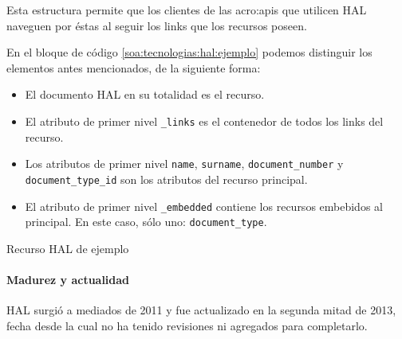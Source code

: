 Esta estructura permite que los clientes de las \glspl{acro:api} que utilicen HAL naveguen por éstas al seguir los links que los recursos poseen.

En el bloque de código \autoref{soa:tecnologias:hal:ejemplo} podemos distinguir los elementos antes mencionados, de la siguiente forma:

\begin{itemize}
  \item El documento HAL en su totalidad es el recurso.
  \item El atributo de primer nivel \verb|_links| es el contenedor de todos los links del recurso.
  \item Los atributos de primer nivel \texttt{name}, \texttt{surname}, \verb|document_number| y \\ \verb|document_type_id| son los atributos del recurso principal.
  \item El atributo de primer nivel \verb|_embedded| contiene los recursos embebidos al principal. En este caso, sólo uno: \verb|document_type|.

\end{itemize}

\begin{listing}
  \caption{Recurso HAL de ejemplo}
  \label{soa:tecnologias:hal:ejemplo}
\end{listing}

\paragraph{Madurez y actualidad}

HAL surgió a mediados de 2011 y fue actualizado en la segunda mitad de 2013, fecha desde la cual no ha tenido revisiones ni agregados para completarlo.
